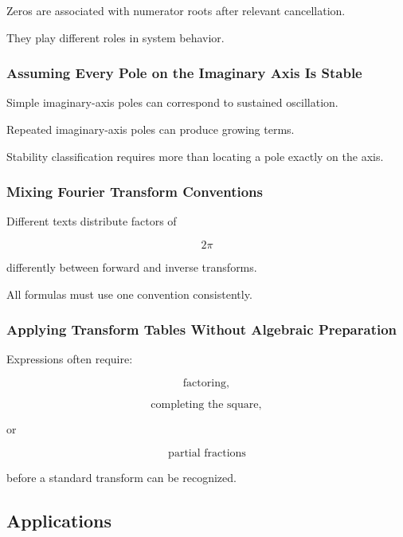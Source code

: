 Zeros are associated with numerator roots after relevant cancellation.

They play different roles in system behavior.

\subsubsection{Assuming Every Pole on the Imaginary Axis Is Stable}

Simple imaginary-axis poles can correspond to sustained oscillation.

Repeated imaginary-axis poles can produce growing terms.

Stability classification requires more than locating a pole exactly on
the axis.

\subsubsection{Mixing Fourier Transform Conventions}

Different texts distribute factors of

\[
2\pi
\]

differently between forward and inverse transforms.

All formulas must use one convention consistently.

\subsubsection{Applying Transform Tables Without Algebraic Preparation}

Expressions often require:

\[
\boxed{
\text{factoring},
}
\]

\[
\boxed{
\text{completing the square},
}
\]

or

\[
\boxed{
\text{partial fractions}
}
\]

before a standard transform can be recognized.

\subsection{Applications}
\label{subsec:transform-method-applications}

